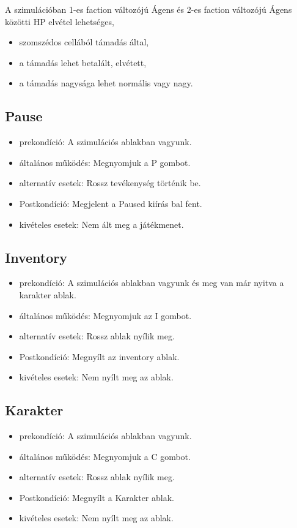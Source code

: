 A szimulációban 1-es faction változójú Ágens és 2-es faction változójú Ágens közötti HP elvétel lehetséges,

\begin{itemize}
    \item szomszédos cellából támadás által,
    \item a támadás lehet betalált, elvétett,
    \item a támadás nagysága lehet normális vagy nagy.
\end{itemize}


\subsection{Pause}

\begin{itemize}
    \item prekondíció: A szimulációs ablakban vagyunk.
    \item általános működés: Megnyomjuk a P gombot.
    \item alternatív esetek: Rossz tevékenység történik be.
    \item Postkondíció: Megjelent a Paused kiírás bal fent.
    \item kivételes esetek: Nem ált meg a játékmenet.
\end{itemize}

\subsection{Inventory}

\begin{itemize}
    \item prekondíció: A szimulációs ablakban vagyunk és meg van már nyitva a karakter ablak.
    \item általános működés: Megnyomjuk az I gombot.
    \item alternatív esetek: Rossz ablak nyílik meg.
    \item Postkondíció: Megnyílt az inventory ablak.
    \item kivételes esetek: Nem nyílt meg az ablak.
\end{itemize}

\subsection{Karakter}

\begin{itemize}
    \item prekondíció: A szimulációs ablakban vagyunk.
    \item általános működés: Megnyomjuk a C gombot.
    \item alternatív esetek: Rossz ablak nyílik meg.
    \item Postkondíció: Megnyílt a Karakter ablak.
    \item kivételes esetek: Nem nyílt meg az ablak.
\end{itemize}

